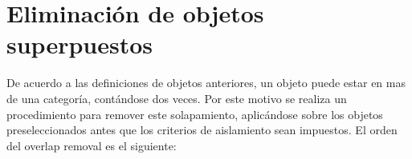%
%
%

\section{Eliminación de objetos superpuestos} %
\label{sec:overlap_romoval_event_veto}

De acuerdo a las definiciones de objetos anteriores, un objeto puede estar en mas de una
categoría, contándose dos veces. Por este motivo se realiza un procedimiento para remover
este solapamiento, aplicándose sobre los objetos preseleccionados antes que los criterios
de aislamiento sean impuestos. El orden del overlap removal es el siguiente:

